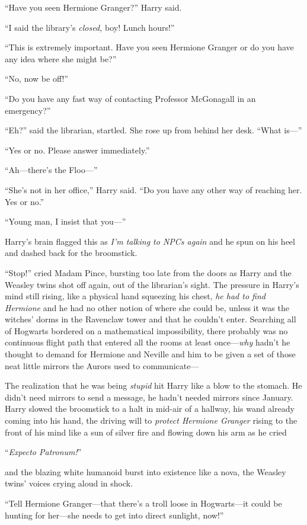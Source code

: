 “Have you seen Hermione Granger?” Harry said.

“I said the library’s \emph{closed,} boy! Lunch hours!”

“This is extremely important. Have you seen Hermione Granger or do you have any idea where she might be?”

“No, now be off!”

“Do you have any fast way of contacting Professor McGonagall in an emergency?”

“Eh?” said the librarian, startled. She rose up from behind her desk. “What is—”

“Yes or no. Please answer immediately.”

“Ah—there’s the Floo—”

“She’s not in her office,” Harry said. “Do you have any other way of reaching her. Yes or no.”

“Young man, I insist that you—”

Harry’s brain flagged this as \emph{I’m talking to NPCs again} and he spun on his heel and dashed back for the broomstick.

“Stop!” cried Madam Pince, bursting too late from the doors as Harry and the Weasley twins shot off again, out of the librarian’s sight. The pressure in Harry’s mind still rising, like a physical hand squeezing his chest, \emph{he had to find Hermione} and he had no other notion of where she could be, unless it was the witches’ dorms in the Ravenclaw tower and that he couldn’t enter. Searching all of Hogwarts bordered on a mathematical impossibility, there probably was no continuous flight path that entered all the rooms at least once—\emph{why} hadn’t he thought to demand for Hermione and Neville and him to be given a set of those neat little mirrors the Aurors used to communicate—

The realization that he was being \emph{stupid} hit Harry like a blow to the stomach. He didn’t need mirrors to send a message, he hadn’t needed mirrors since January. Harry slowed the broomstick to a halt in mid-air of a hallway, his wand already coming into his hand, the driving will to \emph{protect Hermione Granger} rising to the front of his mind like a sun of silver fire and flowing down his arm as he cried

“\emph{Expecto Patronum!}”

and the blazing white humanoid burst into existence like a nova, the Weasley twins’ voices crying aloud in shock.

“Tell Hermione Granger—that there’s a troll loose in Hogwarts—it could be hunting for her—she needs to get into direct sunlight, now!”

